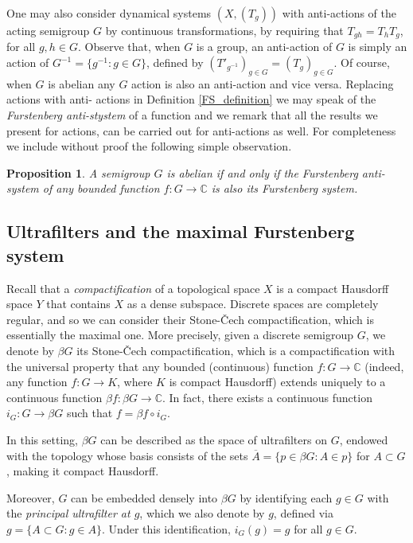 \documentclass{amsart}
\numberwithin{equation}{section}
\newtheorem{proposition}[lemma]{Proposition}
\theoremstyle{definition}
\theoremstyle{plain}
\newcommand{\C}{{\mathbb C}}
\begin{document}
One may also consider dynamical systems $(X,(T_g))$ with 
anti-actions of the acting semigroup 
$G$ by continuous transformations, by requiring that $T_{gh}=T_hT_g$, 
for all $g,h\in G$. Observe that, when $G$ is a group, an anti-action of $G$ is simply an action of 
$G^{-1}=\{g^{-1}:g\in G\}$, defined by $(T'_{g^{-1}})_{g\in G}=(T_g)_{g\in G}$. 
Of course, when $G$ is abelian any $G$ action is also an 
anti-action and vice versa. Replacing actions with anti-
actions in Definition \ref{FS_definition} we may speak 
of the \textit{Furstenberg anti-stystem} of a function 
and we remark that all the results we present for 
actions, can be carried out for anti-actions as well. 
For completeness we include without proof
the following simple observation. 
\begin{proposition}
A semigroup $G$ is abelian if and only if the Furstenberg 
anti-system of any bounded function $f:G\to \C$ is also its Furstenberg system.    
\end{proposition}



\subsection{Ultrafilters and the maximal Furstenberg system}\label{section:Gbeta}
Recall that a \textit{compactification} of a topological space $X$ is a 
compact Hausdorff space $Y$ that contains $X$ as a dense subspace. Discrete spaces are completely regular, and so we can consider their Stone-\v{C}ech compactification, which is essentially the maximal one. More precisely, given a discrete semigroup $G$, we denote by $\beta G$  its Stone-\v{C}ech compactification, which is a compactification with the universal property that any bounded (continuous) function $f:G\to \C$ (indeed, any function $f:G\to K$, where $K$ is compact Hausdorff) extends uniquely to a continuous function $\beta f: \beta G\to \C$. In fact, there exists a continuous function $i_G: G\to \beta G$ such that $f=\beta f \circ i_G$.

In this setting, $\beta G$ can be described as the space of ultrafilters on $G$, endowed with the topology whose basis consists of the sets $\overline{A} = \{p \in \beta G : A \in p\}$ for $A \subset G$, making it compact 
Hausdorff. 

Moreover, $G$ can be embedded densely into $\beta G$ by 
identifying each $g \in G$ with the \emph{principal 
ultrafilter at $g$}, which we also denote by $g$, defined 
via
$g = \{A \subset G : g \in A\}.$
Under this identification, $i_G(g) = g$ for all $g \in G$.
\end{document}
